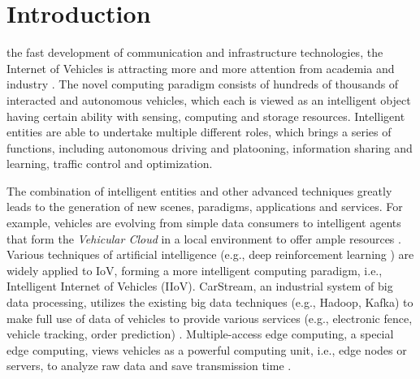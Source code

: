 \documentclass[journal,transmag,11pt]{IEEEtran}
\begin{document}
\maketitle

\IEEEdisplaynontitleabstractindextext

\IEEEpeerreviewmaketitle


\section{Introduction}
 the fast development of communication and infrastructure technologies, the Internet of Vehicles is attracting more and more attention from academia and industry \cite{journals/tits/ChengCZLGL15}. The novel computing paradigm consists of hundreds of thousands of interacted and autonomous vehicles, which each is viewed as an intelligent object having certain ability with sensing, computing and storage resources. Intelligent entities are able to undertake multiple different roles, which brings a series of functions, including autonomous driving and platooning, information sharing and learning, traffic control and optimization.

The combination of intelligent entities and other advanced techniques greatly leads to the generation of new scenes, paradigms, applications and services. For example, vehicles are evolving from simple data consumers to intelligent agents that form the \textit{Vehicular Cloud} in a local environment to offer ample resources \cite{conf/wf-iot/GerlaLPL14}. Various techniques of artificial intelligence (e.g., deep reinforcement learning \cite{journals/tccn/NingDWGRKHK19}) are widely applied to IoV, forming a more intelligent computing paradigm, i.e., Intelligent Internet of Vehicles (IIoV). CarStream, an industrial system of big data processing, utilizes the existing big data techniques (e.g., Hadoop, Kafka) to make full use of data of vehicles to provide various services (e.g., electronic fence, vehicle tracking, order prediction) \cite{journals/pvldb/ZhangWLXL17}. Multiple-access edge computing, a special edge computing, views vehicles as a powerful computing unit, i.e., edge nodes or servers, to analyze raw data and save transmission time \cite{journals/comsur/WangLKLSXH20}.
\end{document}
